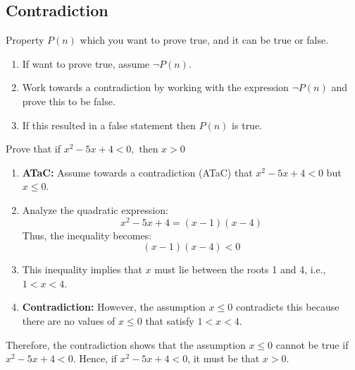 \subsection{Contradiction}
    \begin{process}
        Property $P(n)$ which you want to prove true, and it can be true or false. 
        \begin{enumerate}
            \item If want to prove true, assume $\neg P(n)$.
            \item Work towards a contradiction by working with the expression $\neg P(n)$ and prove this to be false.
            \item If this resulted in a false statement then $P(n)$ is true. 
        \end{enumerate}
        
    \end{process}

    \begin{example}
        Prove that if $x^2 - 5x + 4 < 0, \text{ then } x >0$
        \begin{enumerate}
            \item \textbf{ATaC:} Assume towards a contradiction (ATaC) that \( x^2 - 5x + 4 < 0 \) but \( x \leq 0 \).
            \vspace{1em}
            \item Analyze the quadratic expression:
            \[
            x^2 - 5x + 4 = (x - 1)(x - 4)
            \]
            Thus, the inequality becomes:
            \[
            (x - 1)(x - 4) < 0
            \]
            
            \item This inequality implies that \( x \) must lie between the roots 1 and 4, i.e., \( 1 < x < 4 \).
            \vspace{1em}
            \item \textbf{Contradiction:} However, the assumption \( x \leq 0 \) contradicts this because there are no values of \( x \leq 0 \) that satisfy \( 1 < x < 4 \).
            \end{enumerate}
            \vspace{1em}
            Therefore, the contradiction shows that the assumption \( x \leq 0 \) cannot be true if \( x^2 - 5x + 4 < 0 \). Hence, if \( x^2 - 5x + 4 < 0 \), it must be that \( x > 0 \).
    \end{example}

